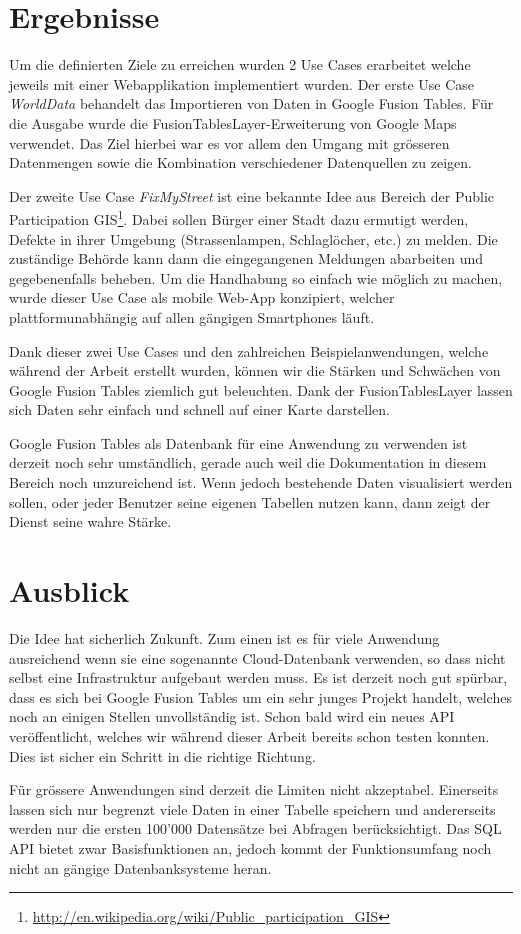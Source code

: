 \section*{Ergebnisse}
Um die definierten Ziele zu erreichen wurden 2 Use Cases erarbeitet welche jeweils mit einer Webapplikation implementiert wurden. Der erste Use Case \emph{WorldData} behandelt das Importieren von Daten in Google Fusion Tables. Für die Ausgabe wurde die FusionTablesLayer-Erweiterung von Google Maps verwendet. Das Ziel hierbei war es vor allem den Umgang mit grösseren Datenmengen sowie  die Kombination verschiedener Datenquellen zu zeigen.

Der zweite Use Case \emph{FixMyStreet} ist eine bekannte Idee aus Bereich der Public Participation \gls{GIS}\footnote{\url{http://en.wikipedia.org/wiki/Public_participation_GIS}}. Dabei sollen Bürger einer Stadt dazu ermutigt werden, Defekte in ihrer Umgebung (Strassenlampen, Schlaglöcher, etc.) zu melden. Die zuständige Behörde kann dann die eingegangenen Meldungen abarbeiten und gegebenenfalls beheben. Um die Handhabung so einfach wie möglich zu machen, wurde dieser Use Case als mobile Web-App konzipiert, welcher plattformunabhängig auf allen gängigen Smartphones läuft.

Dank dieser zwei Use Cases und den zahlreichen Beispielanwendungen, welche während der Arbeit erstellt wurden, können wir die Stärken und Schwächen von Google Fusion Tables ziemlich gut beleuchten. Dank der FusionTablesLayer lassen sich Daten sehr einfach und schnell auf einer Karte darstellen.

Google Fusion Tables als Datenbank für eine Anwendung zu verwenden ist derzeit noch sehr umständlich, gerade auch weil die Dokumentation in diesem Bereich noch unzureichend ist. Wenn jedoch bestehende Daten visualisiert werden sollen, oder jeder Benutzer seine eigenen Tabellen nutzen kann, dann zeigt der Dienst seine wahre Stärke.

\section*{Ausblick}
Die Idee hat sicherlich Zukunft. Zum einen ist es für viele Anwendung ausreichend wenn sie eine sogenannte \gls{Cloud}-Datenbank verwenden, so dass nicht selbst eine Infrastruktur aufgebaut werden muss. Es ist derzeit noch gut spürbar, dass es sich bei Google Fusion Tables um ein sehr junges Projekt handelt, welches noch an einigen Stellen unvollständig ist. Schon bald wird ein neues \gls{API} veröffentlicht, welches wir während dieser Arbeit bereits schon testen konnten. Dies ist sicher ein Schritt in die richtige Richtung.

Für grössere Anwendungen sind derzeit die Limiten nicht akzeptabel. Einerseits lassen sich nur begrenzt viele Daten in einer Tabelle speichern und andererseits werden nur die ersten 100'000 Datensätze bei Abfragen berücksichtigt. Das SQL \gls{API} bietet zwar Basisfunktionen an, jedoch kommt der Funktionsumfang noch nicht an gängige Datenbanksysteme heran.


